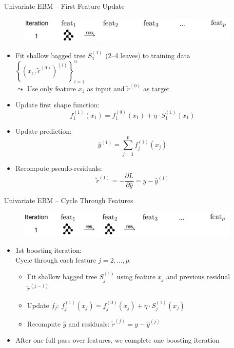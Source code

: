 \documentclass[11pt,compress,t,notes=noshow, aspectratio=169, xcolor=table]{beamer}
\begin{document}
\begin{frame}{Univariate EBM – First Feature Update}
\begin{figure}
    \centering
    \includegraphics[width=\linewidth]{figure/EBM_Step1.png}
\end{figure}
\begin{itemize}
    \item Fit shallow bagged tree $S_1^{(1)}$ (2–4 leaves) to training data $\left\{\left(x_1, \tilde{r}^{(0)}\right)^{(i)}\right\}_{i=1}^n$\\
    $\leadsto$ Use only feature $x_1$ as input and $\tilde{r}^{(0)}$ as target
    \item Update first shape function:
    $$
    f_1^{(1)}(x_1) = f_1^{(0)}(x_1) + \eta \cdot S_1^{(1)}(x_1)
    $$
    \item Update prediction:
    $$
    \hat{y}^{(1)} = \sum_{j=1}^p f_j^{(1)}(x_j)
    $$
    \item Recompute pseudo-residuals:
    $$
    \tilde{r}^{(1)} =  -\frac{\partial L}{\partial \hat{y}} = y - \hat{y}^{(1)}
    $$
\end{itemize}

\end{frame}


\begin{frame}{Univariate EBM – Cycle Through Features}
\begin{figure}
    \centering
    \includegraphics[width=\linewidth]{figure/EBM_Step2.png}
\end{figure}
\begin{itemize}
    \item 1st boosting iteration: \\
    Cycle through each feature $j = 2,\dots,p$:
    \begin{itemize}
        \item Fit shallow bagged tree $S_j^{(1)}$ using feature $x_j$ and previous residual $\tilde{r}^{(j-1)}$ %
        \item Update $f_j$: $f_j^{(1)}(x_j) = f_j^{(0)}(x_j) + \eta \cdot S_j^{(1)}(x_j)$
        \item Recompute $\hat{y}$ and residuals: $\tilde{r}^{(j)} = y - \hat{y}^{(j)}$
    \end{itemize}
    \item After one full pass over features, we complete one boosting iteration
\end{itemize}
\end{frame}
\end{document}
